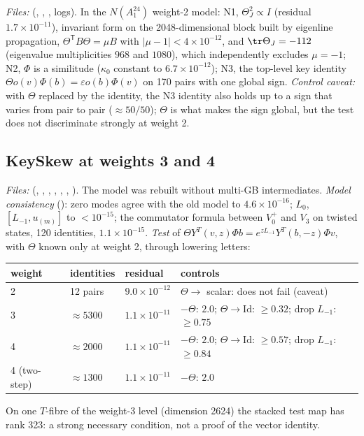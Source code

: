 \emph{Files:}  (, , , logs). In the
$N(A_1^{24})$ weight-2 model: N1, $\Theta_J^2\propto I$ (residual $1.7\times10^{-11}$), invariant form
on the 2048-dimensional block built by eigenline propagation, $\Theta^{\mathsf T}B\Theta=\mu B$ with
$|\mu-1|<4\times10^{-12}$, and $\tr\Theta_J=-112$ (eigenvalue multiplicities $968$ and $1080$), which
independently excludes $\mu=-1$; N2, $\Phi$ is a similitude ($\kappa_0$ constant to
$6.7\times10^{-12}$); N3, the top-level key identity $\Theta o(v)\Phi(b)=\varepsilon o(b)\Phi(v)$ on 170
pairs with one global sign. \emph{Control caveat:} with $\Theta$ replaced by the identity, the N3
identity also holds up to a sign that varies from pair to pair ($\approx50/50$); $\Theta$ is what makes
the sign global, but the test does not discriminate strongly at weight 2.

\subsection{KeySkew at weights 3 and 4}

\emph{Files:}  (, , , ,
, , ). The model was rebuilt without multi-GB
intermediates. \emph{Model consistency} (): zero modes agree with the old model to
$4.6\times10^{-16}$; $L_0$, $[L_{-1},u_{(m)}]$ to $<10^{-15}$; the commutator formula between $V_0^+$ and
$V_3$ on twisted states, 120 identities, $1.1\times10^{-15}$. \emph{Test} of
$\Theta Y^T(v,z)\Phi b=e^{zL_{-1}}Y^T(b,-z)\Phi v$, with $\Theta$ known only at weight 2, through
lowering letters:

\begin{center}
\begin{tabular}{llll}
\toprule
weight & identities & residual & controls \\
\midrule
2 & 12 pairs & $9.0\times10^{-12}$ & $\Theta\to$ scalar: does not fail (caveat) \\
3 & $\approx5300$ & $1.1\times10^{-11}$ & $-\Theta$: $2.0$; $\Theta\to\mathrm{Id}$: $\ge0.32$; drop $L_{-1}$: $\ge0.75$\\
4 & $\approx2000$ & $1.1\times10^{-11}$ & $-\Theta$: $2.0$; $\Theta\to\mathrm{Id}$: $\ge0.57$; drop $L_{-1}$: $\ge0.84$\\
4 (two-step) & $\approx1300$ & $1.1\times10^{-11}$ & $-\Theta$: $2.0$\\
\bottomrule
\end{tabular}
\end{center}
On one $T$-fibre of the weight-3 level (dimension 2624) the stacked test map has rank 323: a strong
necessary condition, not a proof of the vector identity.

